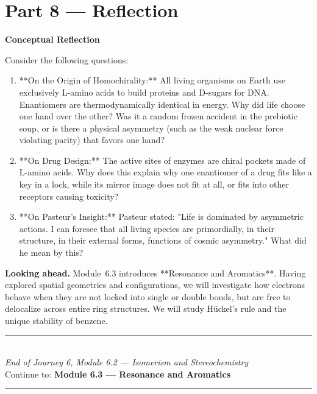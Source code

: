 \documentclass[12pt, a4paper]{book}
\begin{document}
\newpage

\section{Part 8 --- Reflection}

\begin{reflectionbox}
\textbf{Conceptual Reflection}

Consider the following questions:
\begin{enumerate}
  \item **On the Origin of Homochirality:** All living organisms on Earth use exclusively L-amino acids to build proteins and D-sugars for DNA. Enantiomers are thermodynamically identical in energy. Why did life choose one hand over the other? Was it a random frozen accident in the prebiotic soup, or is there a physical asymmetry (such as the weak nuclear force violating parity) that favors one hand?
  \item **On Drug Design:** The active sites of enzymes are chiral pockets made of L-amino acids. Why does this explain why one enantiomer of a drug fits like a key in a lock, while its mirror image does not fit at all, or fits into other receptors causing toxicity?
  \item **On Pasteur's Insight:** Pasteur stated: "Life is dominated by asymmetric actions. I can foresee that all living species are primordially, in their structure, in their external forms, functions of cosmic asymmetry." What did he mean by this?
\end{enumerate}
\end{reflectionbox}

\medskip
\noindent\textbf{Looking ahead.}
Module~6.3 introduces **Resonance and Aromatics**. Having explored spatial geometries and configurations, we will investigate how electrons behave when they are not locked into single or double bonds, but are free to delocalize across entire ring structures. We will study Hückel's rule and the unique stability of benzene.

\vspace{1.4cm}
\begin{center}
{\color{JourneyColor}\rule{0.5\linewidth}{0.8pt}}\\[6pt]
{\small\color{JourneyColor}\textit{End of Journey 6, Module 6.2 --- Isomerism and Stereochemistry}}\\[4pt]
{\small\color{JourneyColor}Continue to: \textbf{Module 6.3 --- Resonance and Aromatics}}\\[6pt]
{\color{JourneyColor}\rule{0.5\linewidth}{0.8pt}}
\end{center}
\end{document}
